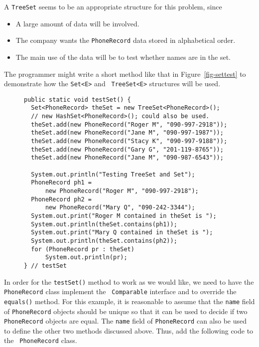 \begin{minipage}{26pc}
A {\tt TreeSet} seems to be an appropriate structure for this problem,
since
\begin{itemize}
\item  {A large amount of data will be involved.}
\item  {The company wants the {\tt PhoneRecord} data stored in 
alphabetical order.}
\item  {The main use of the data will be to test whether names are in the set.}
\end{itemize}
\end{minipage}

\noindent The programmer might write a short method like that in
Figure~\ref{fig-settest} to demonstrate how the {\tt Set<E>} and {\tt
TreeSet<E>} structures will be used.

\begin{figure}[tbh]
\jjjprogstart
\begin{jjjlisting}
\begin{lstlisting}
public static void testSet() {
  Set<PhoneRecord> theSet = new TreeSet<PhoneRecord>();
  // new HashSet<PhoneRecord>(); could also be used.
  theSet.add(new PhoneRecord("Roger M", "090-997-2918"));
  theSet.add(new PhoneRecord("Jane M", "090-997-1987"));
  theSet.add(new PhoneRecord("Stacy K", "090-997-9188"));
  theSet.add(new PhoneRecord("Gary G", "201-119-8765"));
  theSet.add(new PhoneRecord("Jane M", "090-987-6543"));

  System.out.println("Testing TreeSet and Set");
  PhoneRecord ph1 =
      new PhoneRecord("Roger M", "090-997-2918");
  PhoneRecord ph2 =
      new PhoneRecord("Mary Q", "090-242-3344");
  System.out.print("Roger M contained in theSet is ");
  System.out.println(theSet.contains(ph1));
  System.out.print("Mary Q contained in theSet is ");
  System.out.println(theSet.contains(ph2));
  for (PhoneRecord pr : theSet)
      System.out.println(pr);
} // testSet
\end{lstlisting}
\end{jjjlisting}
\end{figure}


In order for the {\tt testSet()} method to work as we would like, we
need to have the {\tt PhoneRecord} class implement the {\tt
Comparable} interface and to override the {\tt equals()} method.  For
this example, it is reasonable to assume that the {\tt name} field of
{\tt PhoneRecord} objects should be unique so that it can be used to
decide if two {\tt PhoneRecord} objects are equal.  The {\tt name}
field of {\tt PhoneRecord} can also be used to define the other two
methods discussed above.  Thus, add the following code to the {\tt
PhoneRecord} class.

